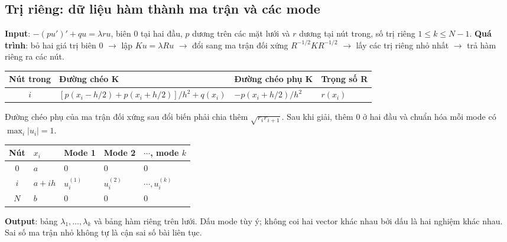 \subsection{Trị riêng: dữ liệu hàm thành ma trận và các mode}
\textbf{Input}: $-(pu')'+qu=\lambda ru$, biên 0 tại hai đầu, $p$ dương trên các mặt lưới và $r$ dương tại nút trong, số trị riêng $1\le k\le N-1$.
\textbf{Quá trình}: bỏ hai giá trị biên 0 $\to$ lập $Ku=\lambda Ru$ $\to$ đổi sang ma trận đối xứng $R^{-1/2}KR^{-1/2}$ $\to$ lấy các trị riêng nhỏ nhất $\to$ trả hàm riêng ra các nút.
\begin{center}\small\begin{tabular}{clll}\toprule
Nút trong&Đường chéo K&Đường chéo phụ K&Trọng số R\\\midrule
$i$&$[p(x_i-h/2)+p(x_i+h/2)]/h^2+q(x_i)$&$-p(x_i+h/2)/h^2$&$r(x_i)$\\\bottomrule
\end{tabular}\end{center}
Đường chéo phụ của ma trận đối xứng sau đổi biến phải chia thêm $\sqrt{r_ir_{i+1}}$. Sau khi giải, thêm 0 ở hai đầu và chuẩn hóa mỗi mode có $\max_i|u_i|=1$.
\begin{center}\small\begin{tabular}{cllll}\toprule
Nút&$x_i$&Mode 1&Mode 2&$\cdots$, mode $k$\\\midrule
0&$a$&0&0&0\\
$i$&$a+ih$&$u_i^{(1)}$&$u_i^{(2)}$&$\cdots,u_i^{(k)}$\\
$N$&$b$&0&0&0\\\bottomrule
\end{tabular}\end{center}
\textbf{Output}: bảng $\lambda_1,\ldots,\lambda_k$ và bảng hàm riêng trên lưới. Dấu mode tùy ý; không coi hai vector khác nhau bởi dấu là hai nghiệm khác nhau. Sai số ma trận nhỏ không tự là cận sai số bài liên tục.
